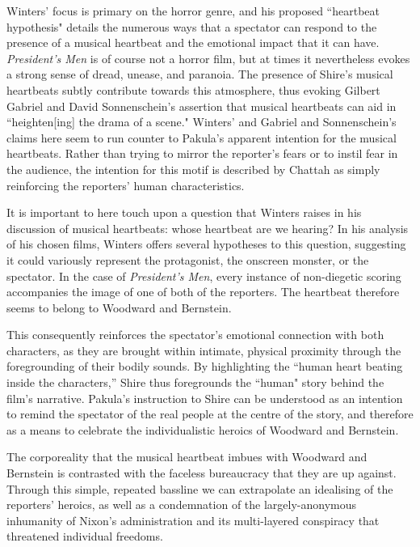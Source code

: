 Winters' focus is primary on the horror genre, and his proposed ``heartbeat hypothesis" details the numerous ways that a spectator can respond to the presence of a musical heartbeat and the emotional impact that it can have.
\textit{President's Men} is of course not a horror film, but at times it nevertheless evokes a strong sense of dread, unease, and paranoia.
The presence of Shire's musical heartbeats subtly contribute towards this atmosphere, thus evoking Gilbert Gabriel and David Sonnenschein's assertion that musical heartbeats can aid in ``heighten[ing] the drama of a scene."\autocites[][116]{gabriel_inner_2016}
Winters' and Gabriel and Sonnenschein's claims here seem to run counter to Pakula's apparent intention for the musical heartbeats.
Rather than trying to mirror the reporter's fears or to instil fear in the audience, the intention for this motif is described by Chattah as simply reinforcing the reporters' human characteristics.

It is important to here touch upon a question that Winters raises in his discussion of musical heartbeats: whose heartbeat are we hearing?
In his analysis of his chosen films, Winters offers several hypotheses to this question, suggesting it could variously represent the protagonist, the onscreen monster, or the spectator.\autocites[][16-18]{winters_corporeality_2008}
In the case of \textit{President's Men}, every instance of non-diegetic scoring accompanies the image of one of both of the reporters.
The heartbeat therefore seems to belong to Woodward and Bernstein.

This consequently reinforces the spectator's emotional connection with both characters, as they are brought within intimate, physical proximity through the foregrounding of their bodily sounds.
By highlighting the ``human heart beating inside the characters,” Shire thus foregrounds the ``human" story behind the film's narrative.
Pakula's instruction to Shire can be understood as an intention to remind the spectator of the real people at the centre of the story, and therefore as a means to celebrate the individualistic heroics of Woodward and Bernstein.

The corporeality that the musical heartbeat imbues with Woodward and Bernstein is contrasted with the faceless bureaucracy that they are up against.
Through this simple, repeated bassline we can extrapolate an idealising of the reporters' heroics, as well as a condemnation of the largely-anonymous inhumanity of Nixon's administration and its multi-layered conspiracy that threatened individual freedoms.


